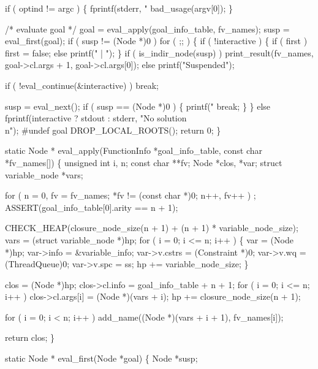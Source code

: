     if ( optind != argc )
    \{
        fprintf(stderr, "%
        bad_usage(argv[0]);
    \}

    /* evaluate goal */
    goal = eval_apply(goal_info_table, fv_names);
    susp = eval_first(goal);
    if ( susp != (Node *)0 )
        for ( ;; )
        \{
            if ( !interactive )
            \{
                if ( first )
                    first = false;
                else
                    printf(" | ");
            \}
            if ( is_indir_node(susp) )
                print_result(fv_names, goal->cl.args + 1, goal->cl.args[0]);
            else
                printf("Suspended");

            if ( !eval_continue(&interactive) )
                break;

            susp = eval_next();
            if ( susp == (Node *)0 )
            \{
                printf("%
                break;
            \}
        \}
    else
        fprintf(interactive ? stdout : stderr, "No solution\\n");
#undef goal
    DROP_LOCAL_ROOTS();
    return 0;
\}

static Node *
eval_apply(FunctionInfo *goal_info_table, const char *fv_names[])
\{
    unsigned int         i, n;
    const char           **fv;
    Node                 *clos, *var;
    struct variable_node *vars;

    for ( n = 0, fv = fv_names; *fv != (const char *)0; n++, fv++ )
        ;
    ASSERT(goal_info_table[0].arity == n + 1);

    CHECK_HEAP(closure_node_size(n + 1) + (n + 1) * variable_node_size);
    vars = (struct variable_node *)hp;
    for ( i = 0; i <= n; i++ )
    \{
        var          = (Node *)hp;
        var->info    = &variable_info;
        var->v.cstrs = (Constraint *)0;
        var->v.wq    = (ThreadQueue)0;
        var->v.spc   = ss;
        hp          += variable_node_size;
    \}

    clos          = (Node *)hp;
    clos->cl.info = goal_info_table + n + 1;
    for ( i = 0; i <= n; i++ )
        clos->cl.args[i] = (Node *)(vars + i);
    hp += closure_node_size(n + 1);

    for ( i = 0; i < n; i++ )
        add_name((Node *)(vars + i + 1), fv_names[i]);

    return clos;
\}

static Node *
eval_first(Node *goal)
\{
    Node *susp;

